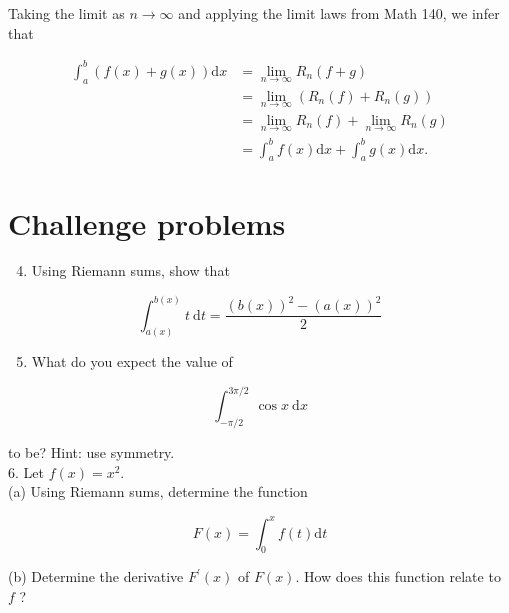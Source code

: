 \documentclass[10pt]{article}
\begin{document}
Taking the limit as $n \rightarrow \infty$ and applying the limit laws from Math 140, we infer that

$$
\begin{aligned}
\int_{a}^{b}(f(x)+g(x)) \mathrm{d} x & =\lim _{n \rightarrow \infty} R_{n}(f+g) \\
& =\lim _{n \rightarrow \infty}\left(R_{n}(f)+R_{n}(g)\right) \\
& =\lim _{n \rightarrow \infty} R_{n}(f)+\lim _{n \rightarrow \infty} R_{n}(g) \\
& =\int_{a}^{b} f(x) \mathrm{d} x+\int_{a}^{b} g(x) \mathrm{d} x .
\end{aligned}
$$

\section*{Challenge problems}
\begin{enumerate}
  \setcounter{enumi}{3}
  \item Using Riemann sums, show that
\end{enumerate}

$$
\int_{a(x)}^{b(x)} t \mathrm{~d} t=\frac{(b(x))^{2}-(a(x))^{2}}{2}
$$

\begin{enumerate}
  \setcounter{enumi}{4}
  \item What do you expect the value of
\end{enumerate}

$$
\int_{-\pi / 2}^{3 \pi / 2} \cos x \mathrm{~d} x
$$

to be? Hint: use symmetry.\\
6. Let $f(x)=x^{2}$.\\
(a) Using Riemann sums, determine the function

$$
F(x)=\int_{0}^{x} f(t) \mathrm{d} t
$$

(b) Determine the derivative $F^{\prime}(x)$ of $F(x)$. How does this function relate to $f$ ?
\end{document}

